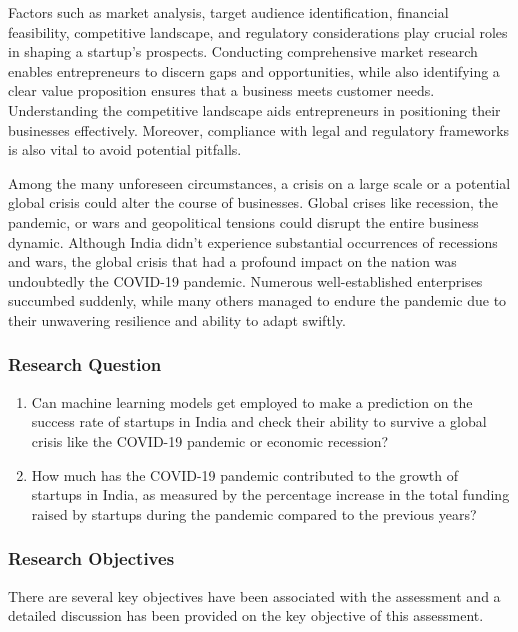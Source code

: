 \documentclass[12pt]{article}
\begin{document}
Factors such as market analysis, target audience identification, financial feasibility, competitive landscape, and regulatory considerations play crucial roles in shaping a startup's prospects. Conducting comprehensive market research enables entrepreneurs to discern gaps and opportunities, while also identifying a clear value proposition ensures that a business meets customer needs. Understanding the competitive landscape aids entrepreneurs in positioning their businesses effectively. Moreover, compliance with legal and regulatory frameworks is also vital to avoid potential pitfalls.

Among the many unforeseen circumstances, a crisis on a large scale or a potential global crisis could alter the course of businesses. Global crises like recession, the pandemic, or wars and geopolitical tensions could disrupt the entire business dynamic. Although India didn't experience substantial occurrences of recessions and wars, the global crisis that had a profound impact on the nation was undoubtedly the COVID-19 pandemic. Numerous well-established enterprises succumbed suddenly, while many others managed to endure the pandemic due to their unwavering resilience and ability to adapt swiftly.

\subsubsection{Research Question}

\begin{enumerate}

\item Can machine learning models get employed to make a prediction on the success rate of startups in India and check their ability to survive a global crisis like the COVID-19 pandemic or economic recession?  

\item How much has the COVID-19 pandemic contributed to the growth of startups in India, as measured by the percentage increase in the total funding raised by startups during the pandemic compared to the previous years?

\end{enumerate}

\subsubsection{Research Objectives}

There are several key objectives have been associated with the assessment and a detailed discussion has been provided on the key objective of this assessment. 
\end{document}
